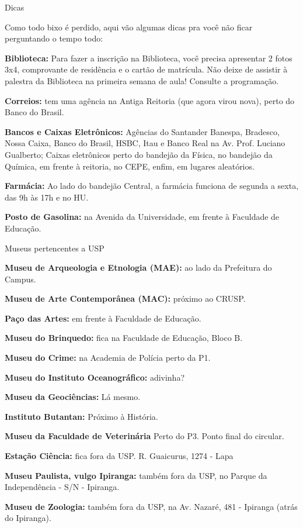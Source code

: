 \begin{secao}{Dicas}

Como todo bixo é perdido, aqui vão algumas dicas pra você não ficar perguntando
o tempo todo:

{\bf Biblioteca:} Para fazer a inscrição na Biblioteca, você precisa apresentar
2 fotos 3x4, comprovante de residência e o cartão de matrícula. Não deixe de assistir à palestra da Biblioteca
na primeira semana de aula! Consulte a programação.

{\bf Correios:} tem uma agência na Antiga Reitoria (que agora virou nova), perto do Banco do Brasil.

{\bf Bancos e Caixas Eletrônicos:} Agências do Santander Banespa, Bradesco, Nossa Caixa, 
Banco do Brasil, HSBC, Itau e Banco Real na Av. Prof. Luciano Gualberto; Caixas eletrônicos
perto do bandejão da Física, no bandejão da Química, em frente à reitoria, no CEPE, enfim,
em lugares aleatórios.

{\bf Farmácia:} Ao lado do bandejão Central, a farmácia funciona de segunda a sexta, das 9h às 17h e no HU.

{\bf Posto de Gasolina:} na Avenida da Universidade, em frente à Faculdade de Educação.

\begin{subsecao}{Museus pertencentes a USP}

{\bf Museu de Arqueologia e Etnologia (MAE):} ao lado da Prefeitura do Campus.

{\bf Museu de Arte Contemporânea (MAC):} próximo ao CRUSP.

{\bf Paço das Artes:} em frente à Faculdade de Educação.

{\bf Museu do Brinquedo:} fica na Faculdade de Educação, Bloco B.

{\bf Museu do Crime:} na Academia de Polícia perto da P1.

{\bf Museu do Instituto Oceanográfico:} adivinha?

{\bf Museu da Geociências:} Lá mesmo.

{\bf Instituto Butantan:} Próximo à História.

{\bf Museu da Faculdade de Veterinária} Perto do P3. Ponto final do circular.

{\bf Estação Ciência:} fica fora da USP. R. Guaicurus, 1274 - Lapa

{\bf Museu Paulista, vulgo Ipiranga: }também fora da USP, no Parque da Independência - S/N  - Ipiranga.

{\bf Museu de Zoologia: }também fora da USP, na Av. Nazaré, 481  - Ipiranga (atrás do Ipiranga).


\end{subsecao}
\end{secao}
